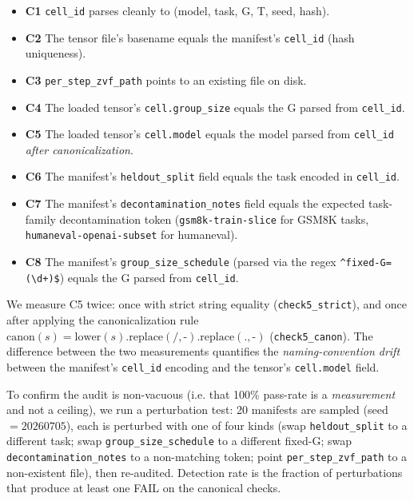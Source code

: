 \documentclass{article}  \usepackage[preprint,nonatbib]{neurips_2026} \usepackage[numbers]{natbib}
\begin{document}
\begin{itemize}
\item \textbf{C1} \texttt{cell\_id} parses cleanly to (model, task, G, T, seed, hash).
\item \textbf{C2} The tensor file's basename equals the manifest's \texttt{cell\_id} (hash uniqueness).
\item \textbf{C3} \texttt{per\_step\_zvf\_path} points to an existing file on disk.
\item \textbf{C4} The loaded tensor's \texttt{cell.group\_size} equals the G parsed from \texttt{cell\_id}.
\item \textbf{C5} The loaded tensor's \texttt{cell.model} equals the model parsed from \texttt{cell\_id} \emph{after canonicalization}.
\item \textbf{C6} The manifest's \texttt{heldout\_split} field equals the task encoded in \texttt{cell\_id}.
\item \textbf{C7} The manifest's \texttt{decontamination\_notes} field equals the expected task-family decontamination token (\texttt{gsm8k-train-slice} for GSM8K tasks, \texttt{humaneval-openai-subset} for humaneval).
\item \textbf{C8} The manifest's \texttt{group\_size\_schedule} (parsed via the regex \texttt{\^{}fixed-G=(\textbackslash d+)\$}) equals the G parsed from \texttt{cell\_id}.
\end{itemize}

We measure C5 twice: once with strict string equality (\texttt{check5\_strict}),
and once after applying the canonicalization rule
$\mathrm{canon}(s) = \mathrm{lower}(s).\mathrm{replace}(\texttt{/}, \texttt{-}).\mathrm{replace}(\texttt{.}, \texttt{-})$
(\texttt{check5\_canon}). The difference between the two measurements
quantifies the \emph{naming-convention drift} between the manifest's
\texttt{cell\_id} encoding and the tensor's \texttt{cell.model} field.

To confirm the audit is non-vacuous (i.e. that 100\% pass-rate is a
\emph{measurement} and not a ceiling), we run a perturbation test: 20
manifests are sampled (seed $= 20260705$), each is perturbed with one of
four kinds (swap \texttt{heldout\_split} to a different task; swap
\texttt{group\_size\_schedule} to a different fixed-G; swap
\texttt{decontamination\_notes} to a non-matching token; point
\texttt{per\_step\_zvf\_path} to a non-existent file), then re-audited.
Detection rate is the fraction of perturbations that produce at least one
FAIL on the canonical checks.
\end{document}
